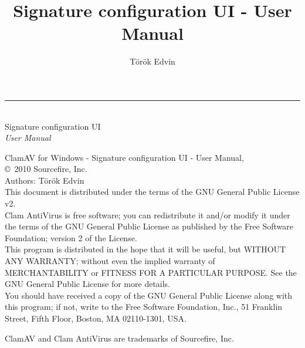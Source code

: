 \documentclass[a4paper,titlepage,english]{report}
\title{Signature configuration UI - User Manual}
\author{T\"{o}r\"{o}k Edvin}
\begin{document}
\setcounter{page}{0}
\pagestyle{empty}
\vspace{3cm}
\begin{flushright}
  \rule[-1ex]{8cm}{3pt}\\
  \huge Signature configuration UI\\
        \huge \emph{User Manual}\\
\end{flushright}
\newpage
\setcounter{page}{1}
\pagestyle{fancy}
\tableofcontents
\vspace{1.0cm}
\noindent
\begin{boxedminipage}[b]{\textwidth}
    ClamAV for Windows - Signature configuration UI - User Manual,\\
    \copyright \  2010 Sourcefire, Inc.\\
    Authors: T\"{o}r\"{o}k Edvin\\
    This document is distributed under the terms of the GNU General
    Public License v2.\\

    Clam AntiVirus is free software; you can redistribute it and/or modify
    it under the terms of the GNU General Public License as published by
    the Free Software Foundation; version 2 of the License.\\

    This program is distributed in the hope that it will be useful,
    but WITHOUT ANY WARRANTY; without even the implied warranty of
    MERCHANTABILITY or FITNESS FOR A PARTICULAR PURPOSE.  See the
    GNU General Public License for more details.\\

    You should have received a copy of the GNU General Public License
    along with this program; if not, write to the Free Software
    Foundation, Inc., 51 Franklin Street, Fifth Floor, Boston,
    MA 02110-1301, USA.
\end{boxedminipage}

\vspace{0.3cm}
\noindent
\begin{boxedminipage}[b]{\textwidth}
    ClamAV and Clam AntiVirus are trademarks of Sourcefire, Inc.
\end{boxedminipage}
\setlength{\parindent}{18pt}









\cleardoublepage
\printglossaries
\end{document}
